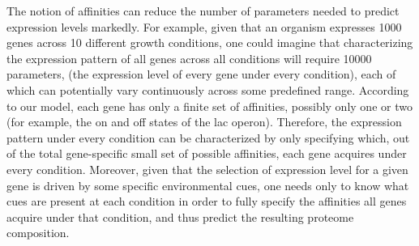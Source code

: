 The notion of affinities can reduce the number of parameters needed to predict expression levels markedly.
For example, given that an organism expresses 1000 genes across 10 different growth conditions, one could imagine that characterizing the expression pattern of all genes across all conditions will require 10000 parameters, (the expression level of every gene under every condition), each of which can potentially vary continuously across some predefined range.
According to our model, each gene has only a finite set of affinities, possibly only one or two (for example, the on and off states of the lac operon).
Therefore, the expression pattern under every condition can be characterized by only specifying which, out of the total gene-specific small set of possible affinities, each gene acquires under every condition.
Moreover, given that the selection of expression level for a given gene is driven by some specific environmental cues, one needs only to know what cues are present at each condition in order to fully specify the affinities all genes acquire under that condition, and thus predict the resulting proteome composition.

